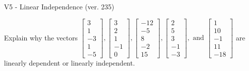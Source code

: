 \begin{exercise}
  \begin{exerciseTitle}V5 - Linear Independence (ver. 235)\end{exerciseTitle}
  \begin{exerciseStatement}
    Explain why the vectors \(\left[\begin{array}{r}
3 \\
1 \\
-3 \\
1 \\
-5
\end{array}\right] , \left[\begin{array}{r}
3 \\
2 \\
1 \\
-1 \\
0
\end{array}\right] , \left[\begin{array}{r}
-12 \\
-5 \\
8 \\
-2 \\
15
\end{array}\right] , \left[\begin{array}{r}
2 \\
5 \\
3 \\
-1 \\
-3
\end{array}\right] , \text{ and } \left[\begin{array}{r}
1 \\
10 \\
-1 \\
11 \\
-18
\end{array}\right]\) are linearly dependent or linearly independent.	



\end{exerciseStatement}
\end{exercise}
